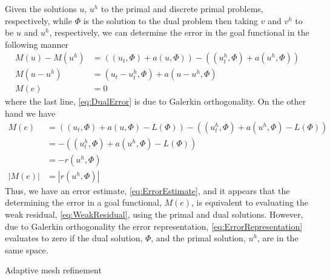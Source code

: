 Given the solutions $u,\, u^h$ to the primal and discrete primal problems,
respectively, while $\Phi$ is the solution to the dual problem then
taking $v$ and $v^h$ to be $u$ and $u^h$, respectively, we can determine the
error in the goal functional in the following manner
\begin{align}
    M(u) - M(u^h) &= \left((u_t, \Phi) + a(u, \Phi)\right)
                      - \left( (u^h_t, \Phi) + a(u^h, \Phi) \right) \nonumber \\
    M(u - u^h) &= (u_t - u^h_t, \Phi) + a(u - u^h, \Phi) \nonumber \\
    M(e) &= 0 \label{eq:DualError}
\end{align}
where the last line, \eqref{eq:DualError} is due to Galerkin orthogonality. On
the other hand we have
\begin{align}
    M(e) & = \left((u_t, \Phi) + a(u, \Phi) - L(\Phi)\right)
             - \left((u^h_t, \Phi) + a(u^h, \Phi) - L(\Phi) \right) \nonumber \\
    &= -\left((u^h_t, \Phi) + a(u^h, \Phi) - L(\Phi) \right) \nonumber \\
    &= -r(u^h, \Phi) \label{eq:ErrorRepresentation} \\
    |M(e)| &= |r(u^h, \Phi)| \label{eq:ErrorEstimate}
\end{align}
Thus, we have an error estimate, \eqref{eq:ErrorEstimate}, and it appears that
the determining the error in a goal functional, $M(e)$, is equivalent to
evaluating the weak residual, \eqref{eq:WeakResidual}, using the primal and dual
solutions. However, due to Galerkin orthogonality the error representation,
\eqref{eq:ErrorRepresentation} evaluates to zero if the dual solution, $\Phi$,
and the primal solution, $u^h$, are in the same space.

\begin{algorithm}[!htp]
\begin{minipage}[t]{\columnwidth} %
  \caption{Adaptive mesh refinement} \label{alg:Adaptivity}
    \vspace{0.5em}
  \SetAlgoLined
\end{minipage}
\end{algorithm}
